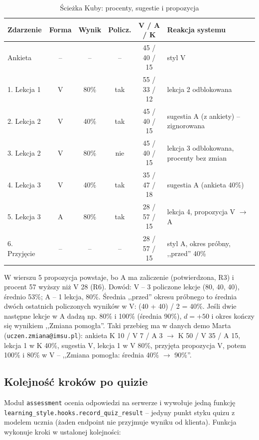 \begin{table}[H]
\centering
\small
\begin{tabular}{|l|c|c|c|c|p{5.4cm}|}
\hline
\textbf{Zdarzenie} & \textbf{Forma} & \textbf{Wynik} & \textbf{Policz.} & \textbf{V / A / K} & \textbf{Reakcja systemu} \\ \hline
Ankieta & -- & -- & -- & 45 / 40 / 15 & styl V \\ \hline
1. Lekcja 1 & V & 80\% & tak & 55 / 33 / 12 & lekcja 2 odblokowana \\ \hline
2. Lekcja 2 & V & 40\% & tak & 45 / 40 / 15 & sugestia A (z ankiety) -- zignorowana \\ \hline
3. Lekcja 2 & V & 80\% & nie & 45 / 40 / 15 & lekcja 3 odblokowana, procenty bez zmian \\ \hline
4. Lekcja 3 & V & 40\% & tak & 35 / 47 / 18 & sugestia A (ankieta 40\%) \\ \hline
5. Lekcja 3 & A & 80\% & tak & 28 / 57 / 15 & lekcja 4, propozycja V $\to$ A \\ \hline
6. Przyjęcie & -- & -- & -- & 28 / 57 / 15 & styl A, okres próbny, ,,przed'' 40\% \\ \hline
\end{tabular}
\caption{Ścieżka Kuby: procenty, sugestie i propozycja}
\end{table}

W wierszu 5 propozycja powstaje, bo A ma zaliczenie (potwierdzona, R3) i procent 57 wyższy niż V 28 (R6). Dowód: V -- 3 policzone lekcje (80, 40, 40), średnio 53\%; A -- 1 lekcja, 80\%. Średnia ,,przed'' okresu próbnego to średnia dwóch ostatnich policzonych wyników w V: (40 + 40) / 2 = 40\%. Jeśli dwie następne lekcje w A dadzą np. 80\% i 100\% (średnia 90\%), $d = +50$ i okres kończy się wynikiem ,,Zmiana pomogła''. Taki przebieg ma w danych demo Marta (\texttt{uczen.zmiana@imsu.pl}): ankieta K 10 / V 7 / A 3 $\to$ K 50 / V 35 / A 15, lekcja 1 w K 40\%, sugestia V, lekcja 1 w V 80\%, przyjęta propozycja V, potem 100\% i 80\% w V -- ,,Zmiana pomogła: średnia 40\% $\to$ 90\%''.

\subsection{Kolejność kroków po quizie}

Moduł \texttt{assessment} ocenia odpowiedzi na serwerze i wywołuje jedną funkcję \texttt{learning\_style.hooks.record\_quiz\_result} -- jedyny punkt styku quizu z modelem ucznia (żaden endpoint nie przyjmuje wyniku od klienta). Funkcja wykonuje kroki w ustalonej kolejności:

